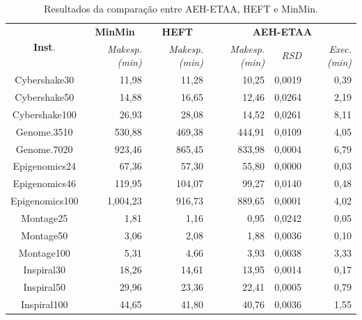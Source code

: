 

\begin{table}[H]
\small
\begin{center}
\caption{Resultados da comparação entre AEH-ETAA, HEFT e MinMin.}
\label{teoricoSintetico}
\begin{tabular}{|c|r|r|r|r|r|}\hline 
\multirow{2}{1cm}{\textbf{Inst}.} & \multicolumn{1}{|c|}{\textbf{MinMin}} & \multicolumn{1}{|c|}{\textbf{HEFT}} & \multicolumn{3}{|c|}{\textbf{AEH-ETAA}} \\    
\cline{2-6}  
                &\textit{	Makesp. (min)} & \textit{Makesp. (min)} &	\textit{Makesp. (min)} & \textit{RSD}	 & \textit{Exec. (min)}\\
\hline
\hline
Cybershake30    &	11,98	       & 11,28          &   10,25              & 0,0019    &	0,39          \\
Cybershake50    &	14,88	       & 16,65	        &   12,46	       & 0,0264    &	2,19          \\
Cybershake100   &   26,93	       & 28,08	        &   14,52	       & 0,0261    &    8,11          \\
Genome.3510     &	530,88         & 469,38         &	444,91         & 0,0109    &	4,05          \\
Genome.7020     &	923,46         & 865,45         &	833,98         & 0,0004    &	6,79          \\
Epigenomics24   &	67,36          & 57,30          &	55,80          & 0,0000    &    0,03          \\
Epigenomics46   &	119,95         & 104,07         &	99,27          & 0,0140    &    0,48          \\
Epigenomics100  &   1,004,23           & 916,73         &	889,65         & 0,0001    &    4,02          \\
Montage25	&   1,81               & 1,16           &	0,95           & 0,0242    &	0,05          \\
Montage50       &   3,06               & 2,08           &	1,88           & 0,0036    &	0,10          \\
Montage100	    &   5,31           & 4,66           &	3,93           & 0,0038    &	3,33          \\
Inspiral30	    &   18,26          & 14,61          &	13,95          & 0,0014    &	0,17          \\
Inspiral50	    &   29,96          & 23,36          &	22,41          & 0,0005    &	0,79          \\
Inspiral100	    &   44,65          & 41,80          &	40,76          & 0,0036    &	1,55          \\
\hline
\end{tabular}
\end{center}
\end{table}	




